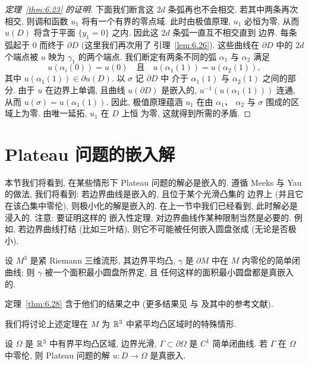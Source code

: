 \begin{proof}[定理~\ref{thm:6.23} 的证明]
下面我们断言这 $2d$ 条弧再也不会相交. 若其中两条再次相交, 则调和函数
$u_1$ 将有一个有界的零点域. 此时由极值原理, $u_1$ 必恒为零, 从而
$u(D)$ 将含于平面 $\{y_1=0\}$ 之内. 因此这 $2d$ 条弧一直互不相交直到
边界. 每条弧起于 $0$ 而终于 $\partial D$ (这里我们再次用了
引理~\ref{lem:6.26}). 这些曲线在 $\partial D$ 中的 $2d$ 个端点被 $u$
映为 $\gamma_1$ 的两个端点. 我们断定有两条不同的弧 $\alpha_1$ 与
$\alpha_2$ 满足
\begin{equation}
u(\alpha_i(0))=u(0)\quad\text{且}\quad
u(\alpha_1(1))=u(\alpha_2(1)),
\label{eq:6.109}
\end{equation}
其中 $u(\alpha_1(1))\in\partial u(D)$. 以 $\sigma$ 记 $\partial D$ 中
介于 $\alpha_1(1)$ 与 $\alpha_2(1)$ 之间的部分. 由于 $u$ 在边界上单调,
且曲线 $u(\partial D)$ 是嵌入的, $u^{-1}(u(\alpha_1(1)))$ 连通, 从而
$u(\sigma)=u(\alpha_1(1))$. 因此, 极值原理蕴涵 $u_1$ 在由 $\alpha_1$、
$\alpha_2$ 与 $\sigma$ 围成的区域上为零. 由唯一延拓, $u_1$ 在 $D$ 上恒
为零, 这就得到所需的矛盾.
\end{proof}

\section{Plateau 问题的嵌入解}
\label{sec:6.5}

本节我们将看到, 在某些情形下 Plateau 问题的解必是嵌入的. 遵循 Meeks
与 Yau 的做法, 我们将看到: 若边界曲线是嵌入的, 且位于某个光滑凸集的
边界上 (并且它在该凸集中零伦), 则极小化的解是嵌入的. 在上一节中我们已经看到, 此时解必是浸入的. 注意: 要证明这样的
嵌入性定理, 对边界曲线作某种限制当然是必要的. 例如, 若边界曲线打结
(比如三叶结), 则它不可能被任何嵌入圆盘张成 (无论是否极小).

\begin{theorem}
\label{thm:6.28}
设 $M^3$ 是紧 Riemann 三维流形, 其边界平均凸, $\gamma$ 是 $\partial M$
中在 $M$ 内零伦的简单闭曲线; 则 $\gamma$ 被一个面积最小圆盘所界定, 且
任何这样的面积最小圆盘都是真嵌入的.
\end{theorem}

定理~\ref{thm:6.28} 含于他们的结果之中 (更多结果见 \cite{MeY1} 与
\cite{MeY2} 及其中的参考文献).

我们将讨论上述定理在 $M$ 为 $\mathbb{R}^3$ 中紧平均凸区域时的特殊情形.

\begin{theorem}
\label{thm:6.29}
设 $\Omega$ 是 $\mathbb{R}^3$ 中有界平均凸区域, 边界光滑, $\Gamma\subset\partial\Omega$
是 $C^1$ 简单闭曲线. 若 $\Gamma$ 在 $\Omega$ 中零伦, 则 Plateau 问题的解
$u:D\to\Omega$ 是真嵌入.
\end{theorem}


